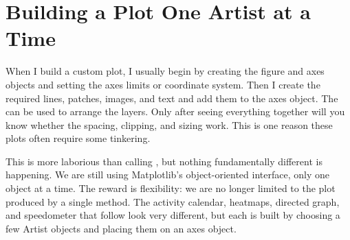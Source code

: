 \section{Building a Plot One Artist at a Time}

When I build a custom plot, I usually begin by creating the figure and axes objects and setting the axes limits or coordinate system. Then I create the required lines, patches, images, and text and add them to the axes object. The  can be used to arrange the layers. Only after seeing everything together will you know whether the spacing, clipping, and sizing work. This is one reason these plots often require some tinkering.

This is more laborious than calling , but nothing fundamentally different is happening. We are still using Matplotlib's object-oriented interface, only one object at a time. The reward is flexibility: we are no longer limited to the plot produced by a single method. The activity calendar, heatmaps, directed graph, and speedometer that follow look very different, but each is built by choosing a few Artist objects and placing them on an axes object.
